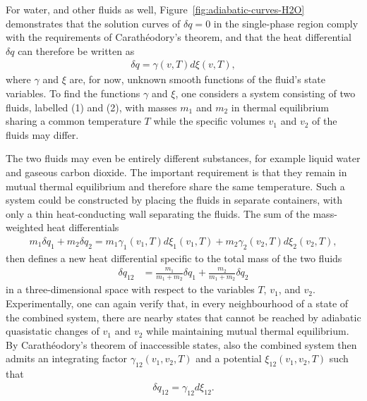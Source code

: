 For water, and other fluids as well, Figure~\ref{fig:adiabatic-curves-H2O} demonstrates that the solution curves of $\delta q=0$ in the single-phase region comply with the requirements of Carath\'eodory's theorem, and that the heat differential $\delta q$ can therefore be written as
\begin{align}
    \delta q=\gamma(v,T) d\xi(v,T),
\end{align}
where $\gamma$ and $\xi$ are, for now, unknown smooth functions of the fluid's state variables. To find the functions $\gamma$ and $\xi$, one considers a system consisting of two fluids, labelled (1) and (2), with masses $m_1$ and $m_2$ in thermal equilibrium sharing a common temperature $T$ while the specific volumes $v_1$ and $v_2$ of the fluids may differ. 

The two fluids may even be entirely different substances, for example liquid water and gaseous carbon dioxide. The important requirement is that they remain in mutual thermal equilibrium and therefore share the same temperature. Such a system could be constructed by placing the fluids in separate containers, with only a thin heat-conducting wall separating the fluids. The sum of the mass-weighted heat differentials
\begin{align}
    m_1\delta q_1+m_2\delta q_2=m_1\gamma_1(v_1,T)d\xi_1(v_1,T)+m_2\gamma_2(v_2,T)d\xi_2(v_2,T),
\end{align}
then defines a new heat differential specific to the total mass of the two fluids
\begin{align}
    \delta q_{12}&=\frac{m_1}{m_1+m_2}\delta q_1+\frac{m_2}{m_1+m_2}\delta q_2
\end{align}
in a three-dimensional space with respect to the variables $T$, $v_1$, and $v_2$. 
Experimentally, one can again verify that, in every neighbourhood of a state of the combined system, there are nearby states that cannot be reached by adiabatic
quasistatic changes of $v_1$ and $v_2$ while maintaining mutual thermal equilibrium. By Carath\'eodory's theorem of inaccessible states, also the combined system then admits an integrating factor $\gamma_{12}(v_1,v_2,T)$ and a potential $\xi_{12}(v_1,v_2,T)$ such that
\begin{align}
    \delta q_{12}=\gamma_{12}d\xi_{12}.
\end{align}

